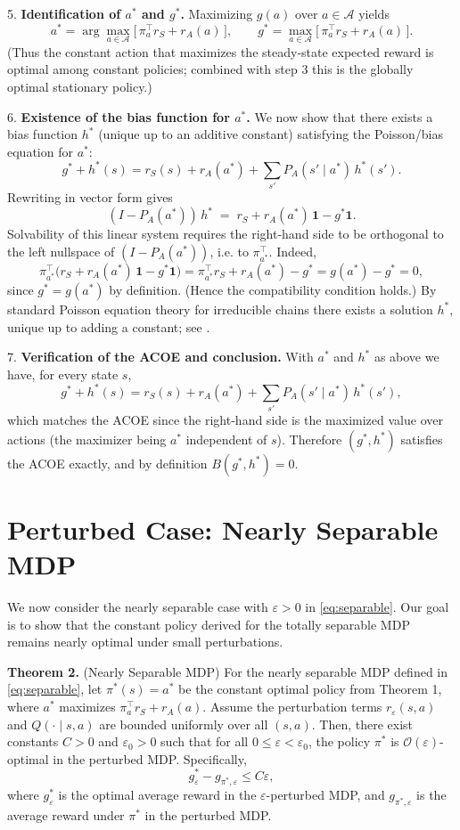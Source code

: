 \documentclass{article}
\begin{document}
5. {\bf Identification of $a^*$ and $g^*$.}  
Maximizing $g(a)$ over $a\in\mathcal{A}$ yields
\[
a^* = \arg\max_{a\in\mathcal{A}} \big[\, \pi_a^\top r_S + r_A(a)\,\big], \qquad
g^* = \max_{a\in\mathcal{A}} \big[\, \pi_a^\top r_S + r_A(a)\,\big].
\]
(Thus the constant action that maximizes the steady-state expected reward is optimal among constant policies; combined with step 3 this is the globally optimal stationary policy.)

6. {\bf Existence of the bias function for $a^*$.}  
We now show that there exists a bias function $h^*$ (unique up to an additive constant) satisfying the Poisson/bias equation for $a^*$:
\[
g^* + h^*(s) = r_S(s) + r_A(a^*) + \sum_{s'} P_A(s' \mid a^*)\, h^*(s').
\]
Rewriting in vector form gives
\[
(I - P_A(a^*))\, h^* \;=\; r_S + r_A(a^*)\,\mathbf{1} - g^* \mathbf{1}.
\]
Solvability of this linear system requires the right-hand side to be orthogonal to the left nullspace of $(I-P_A(a^*))$, i.e. to $\pi_{a^*}^\top$. Indeed,
\[
\pi_{a^*}^\top \big( r_S + r_A(a^*)\,\mathbf{1} - g^* \mathbf{1} \big)
= \pi_{a^*}^\top r_S + r_A(a^*) - g^* = g(a^*) - g^* = 0,
\]
since $g^* = g(a^*)$ by definition. (Hence the compatibility condition holds.) By standard Poisson equation theory for irreducible chains there exists a solution $h^*$, unique up to adding a constant; see \cite{HernandezLerma1999,Puterman1994}.

7. {\bf Verification of the ACOE and conclusion.}  
With $a^*$ and $h^*$ as above we have, for every state $s$,
\[
g^* + h^*(s) = r_S(s) + r_A(a^*) + \sum_{s'} P_A(s' \mid a^*)\, h^*(s'),
\]
which matches the ACOE since the right-hand side is the maximized value over actions (the maximizer being $a^*$ independent of $s$). Therefore $(g^*,h^*)$ satisfies the ACOE exactly, and by definition $B(g^*,h^*)=0$.


\section{Perturbed Case: Nearly Separable MDP}

We now consider the nearly separable case with $\varepsilon > 0$ in \eqref{eq:separable}. Our goal is to show that the constant policy derived for the totally separable MDP remains nearly optimal under small perturbations.

\textbf{Theorem 2.} (Nearly Separable MDP)  
For the nearly separable MDP defined in \eqref{eq:separable}, let $\pi^*(s) = a^*$ be the constant optimal policy from Theorem 1, where $a^*$ maximizes $\pi_a^\top r_S + r_A(a)$. Assume the perturbation terms $r_\varepsilon(s,a)$ and $Q(\cdot \mid s,a)$ are bounded uniformly over all $(s,a)$. Then, there exist constants $C > 0$ and $\varepsilon_0 > 0$ such that for all $0 \le \varepsilon < \varepsilon_0$, the policy $\pi^*$ is $\mathcal{O}(\varepsilon)$-optimal in the perturbed MDP. Specifically,
\[
g_\varepsilon^* - g_{\pi^*,\varepsilon} \le C \varepsilon,
\]
where $g_\varepsilon^*$ is the optimal average reward in the $\varepsilon$-perturbed MDP, and $g_{\pi^*,\varepsilon}$ is the average reward under $\pi^*$ in the perturbed MDP.
\end{document}

